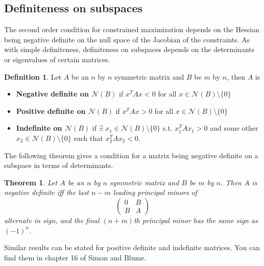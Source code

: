 \documentclass[12pt,reqno]{amsart}
\newtheorem{theorem}{Theorem}[section]
\theoremstyle{definition}
\newtheorem{definition}{Definition}[section]
\begin{document}
\subsection{Definiteness on subspaces}

The second order condition for constrained maximization depends on the
Hessian being negative definite on the null space of the Jacobian of
the constraints. As with simple definiteness, definiteness on
subspaces depends on the determinants or eigenvalues of certain
matrices.
\begin{definition}
  Let $A$ be an $n$ by $n$ symmetric matrix and $B$ be $m$ by $n$, then $A$ is 
  \begin{itemize}
  \item \textbf{Negative definite on $\mathcal{N}(B)$} if $x^T A x <
    0$ for all $x \in \mathcal{N}(B) \setminus \{0\}$ 
  \item \textbf{Positive definite on $\mathcal{N}(B)$} if $x^T A x >
    0$ for all $x \in \mathcal{N}(B) \setminus \{0\}$ 
  \item \textbf{Indefinite on $\mathcal{N}(B)$} if $\exists$ $x_1 \in
    \mathcal{N}(B) \setminus \{0\}$  
    s.t. $x_1^T A x_1 > 0$ and 
    some other $x_2 \in \mathcal{N}(B) \setminus \{0\}$  such that
    $x_2^T A x_2 < 0$. 
  \end{itemize}  
\end{definition}
The following theorem gives a condition for a matrix being negative
definite on a subspace in terms of determinants.
\begin{theorem}\label{thm:nds}
  Let $A$ be an $n$ by $n$ symmetric matrix and $B$ be $m$ by
  $n$. Then $A$ is negative definite iff the last $n-m$ leading principal
  minors of  
  \[
    \begin{pmatrix} 0 & B \\
      B & A 
    \end{pmatrix}
  \]
  alternate in sign, and the final $(n+m)$th principal minor has the
  same sign as $(-1)^n$.
\end{theorem}
Similar results can be stated for positive definite and indefinite
matrices. You can find them in chapter 16 of Simon and Blume.
\end{document}
